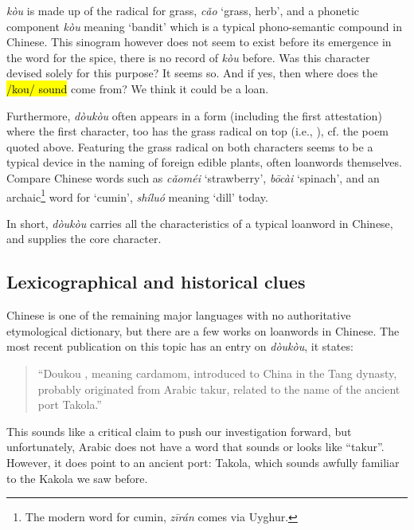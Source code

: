 \documentclass[12pt]{article}
\newcommand{\tc}[1]{\traditionalchinesefont{#1}\rmfamily}
\begin{document}
\tc{蔻} \textit{kòu} is made up of the radical for grass, \tc{艹} \textit{cǎo} `grass, herb', and a phonetic component \tc{寇} \textit{kòu} meaning `bandit' which is a typical phono-semantic compound in Chinese. This sinogram however does not seem to exist before its emergence in the word for the spice, there is no record of \tc{蔻} \textit{kòu} before. Was this character devised solely for this purpose? It seems so. And if yes, then where does the \hl{/kou/ sound} come from? We think it could be a loan.

Furthermore, \textit{dòukòu} often appears in a form (including the first attestation) where the first character, too has the grass radical on top (i.e., \tc{荳蔻}), cf. the poem quoted above. Featuring the grass radical on both characters seems to be a typical device in the naming of foreign edible plants, often loanwords themselves. Compare Chinese words such as \tc{草莓} \textit{cǎoméi} `strawberry', \tc{菠菜} \textit{bōcài} `spinach', and an archaic\footnote{The modern word for cumin, \tc{孜然} \textit{zīrán} comes via Uyghur.} word for `cumin', \tc{蒔蘿} \textit{shíluó} meaning `dill' today.

In short, \textit{dòukòu} carries all the characteristics of a typical loanword in Chinese, and supplies the core character.

\subsection{Lexicographical and historical clues}

Chinese is one of the remaining major languages with no authoritative etymological dictionary, but there are a few works on loanwords in Chinese. The most recent publication on this topic has an entry on \textit{dòukòu}, it states: 

\begin{quote}
	``Doukou \tc{豆蔻}, meaning cardamom, introduced to China in the Tang dynasty, probably originated from Arabic takur, related to the name of the ancient port Takola.'' \parencite[44]{shi_2021_loanwords}
\end{quote}

This sounds like a critical claim to push our investigation forward, but unfortunately, Arabic does not have a word that sounds or looks like ``takur''. However, it does point to an ancient port: Takola, which sounds awfully familiar to the Kakola we saw before.
\end{document}
